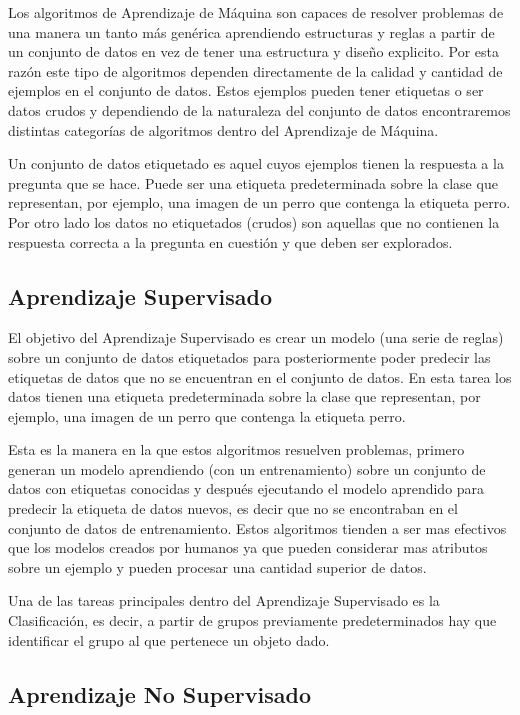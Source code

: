 Los algoritmos de Aprendizaje de Máquina son capaces de resolver problemas de una manera un tanto más genérica aprendiendo estructuras y reglas a partir de un conjunto de datos en vez de tener una estructura y diseño explicito. Por esta razón este tipo de algoritmos dependen directamente de la calidad y cantidad de ejemplos en el conjunto de datos. Estos ejemplos pueden tener etiquetas o ser datos crudos y dependiendo de la naturaleza del conjunto de datos encontraremos distintas categorías de algoritmos dentro del Aprendizaje de Máquina. \cite{rebala_introduction_2019}

Un conjunto de datos etiquetado es aquel cuyos ejemplos tienen la respuesta a la pregunta que se hace. Puede ser una etiqueta predeterminada sobre la clase que representan, por ejemplo, una imagen de un perro que contenga la etiqueta perro. Por otro lado los datos no etiquetados (crudos) son aquellas que no contienen la respuesta correcta a la pregunta en cuestión y que deben ser explorados. 

\subsection{Aprendizaje Supervisado}

El objetivo del Aprendizaje Supervisado es crear un modelo (una serie de reglas) sobre un conjunto de datos etiquetados para posteriormente poder predecir las etiquetas de datos que no se encuentran en el conjunto de datos. \cite{rebala_introduction_2019} En esta tarea los datos tienen una etiqueta predeterminada sobre la clase que  representan, por ejemplo, una imagen de un perro que contenga la etiqueta perro. 

Esta es la manera en la que estos algoritmos resuelven problemas, primero generan un modelo aprendiendo (con un entrenamiento) sobre un conjunto de datos con etiquetas conocidas y después ejecutando el modelo aprendido para predecir la etiqueta de datos nuevos, es decir que no se encontraban en el conjunto de datos de entrenamiento. Estos algoritmos tienden a ser mas efectivos que los modelos creados por humanos ya que pueden considerar mas atributos sobre un ejemplo y pueden procesar una cantidad superior de datos. \cite{rebala_introduction_2019}

Una de las tareas principales dentro del Aprendizaje Supervisado es la Clasificación, es decir, a partir de grupos previamente predeterminados hay que identificar el grupo al que pertenece un objeto dado.

\subsection{Aprendizaje No Supervisado}

